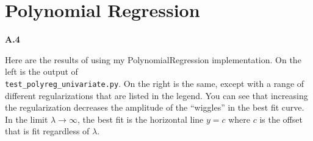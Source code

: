 \documentclass{article}
\begin{document}
\newpage

\section*{Polynomial Regression}

\textbf{A.4}

Here are the results of using my PolynomialRegression implementation.
On the left is the output of \\ \texttt{test\_polyreg\_univariate.py}.
On the right is the same, except with a range of different regularizations that are listed in the legend.
You can see that increasing the regularization decreases the amplitude of the ``wiggles'' in the best fit curve.
In the limit $\lambda \to \infty$, the best fit is the horizontal line $y = c$ where $c$ is the offset that is fit regardless of $\lambda$.
\end{document}
